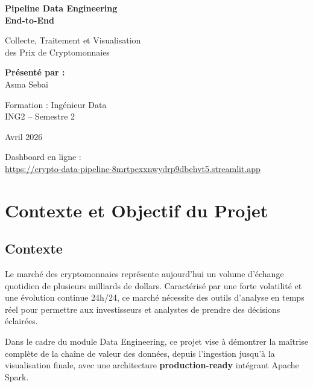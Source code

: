 \documentclass[12pt,a4paper]{article}
\begin{document}
\begin{titlepage}
    \centering
    \vspace*{2cm}

    {\Huge\bfseries Pipeline Data Engineering\\[0.5cm] End-to-End\par}
    \vspace{1.5cm}

    {\Large Collecte, Traitement et Visualisation\\
    des Prix de Cryptomonnaies\par}
    \vspace{3cm}

    {\Large\textbf{Présenté par :}\\[0.3cm]
    \large Asma Sebai\par}
    \vspace{2cm}

    {\large Formation : Ingénieur Data\\
    ING2 -- Semestre 2\par}
    \vspace{1cm}

    {\large Avril 2026\par}

    \vfill

    {\large Dashboard en ligne :\\
    \url{https://crypto-data-pipeline-8mrtpexxnwydrp9dbehvt5.streamlit.app}\par}
\end{titlepage}

\tableofcontents
\newpage

\section{Contexte et Objectif du Projet}

\subsection{Contexte}
Le marché des cryptomonnaies représente aujourd'hui un volume d'échange quotidien de plusieurs milliards de dollars. Caractérisé par une forte volatilité et une évolution continue 24h/24, ce marché nécessite des outils d'analyse en temps réel pour permettre aux investisseurs et analystes de prendre des décisions éclairées.

Dans le cadre du module Data Engineering, ce projet vise à démontrer la maîtrise complète de la chaîne de valeur des données, depuis l'ingestion jusqu'à la visualisation finale, avec une architecture \textbf{production-ready} intégrant Apache Spark.
\end{document}
